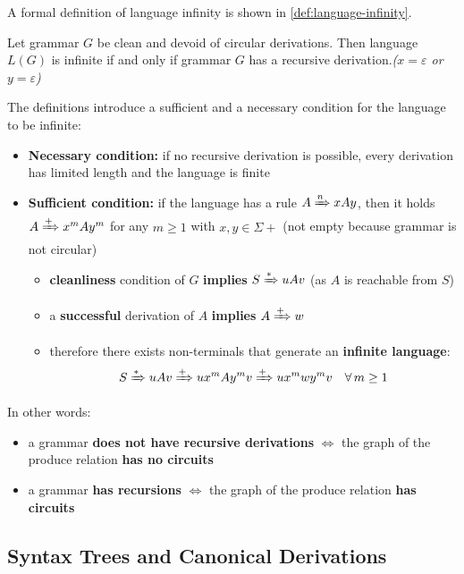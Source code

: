 \documentclass[english]{article}
\begin{document}
A formal definition of language infinity is shown in \ref{def:language-infinity}.

\begin{definition}
  Let grammar \(G\) be clean and devoid of circular derivations.
  Then language \(L(G)\) is infinite if and only if grammar \(G\) has a recursive derivation.\textit{(\(x=\varepsilon\) or \(y=\varepsilon\))}
  \label{def:language-infinity}
\end{definition}

\bigskip
The definitions introduce a sufficient and a necessary condition for the language to be infinite:

\begin{itemize}
  \item \textbf{Necessary condition:} if no recursive derivation is possible, every derivation has limited length and the language is finite
  \item \textbf{Sufficient condition:} if the language has a rule \(A \xRightarrow{n} x A y\), then it holds \(A \xRightarrow{+} x^m A y^m\) for any \(m \geq 1\) with \(x, y \in \Sigma+\) (not empty because grammar is not circular)
        \begin{itemize}
          \item \textbf{cleanliness} condition of \(G\) \textbf{implies} \(S \xRightarrow{\ast} uAv\) (as \(A\) is reachable from \(S\))
          \item a \textbf{successful} derivation of \(A\) \textbf{implies} \(A \xRightarrow{+} w\)
          \item therefore there exists non-terminals that generate an \textbf{infinite language}:
                \[ S \xRightarrow{\ast} uAv \xRightarrow{+}ux^m Ay^m v \xRightarrow{+} u x^m w y^m v \quad \forall \, m \geq 1 \]
        \end{itemize}
\end{itemize}

\bigskip
In other words:

\begin{itemize}
  \item a grammar \textbf{does not have recursive derivations} \(\Longleftrightarrow\) the graph of the produce relation \textbf{has no circuits}
  \item a grammar \textbf{has recursions} \(\Longleftrightarrow\) the graph of the produce relation \textbf{has circuits}
\end{itemize}

\subsection{Syntax Trees and Canonical Derivations}
\end{document}
